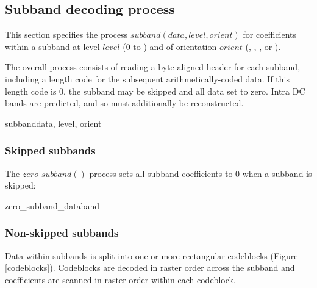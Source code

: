 \subsection{Subband decoding process}

\label{subbanddecodeprocess}

This section specifies the process $subband(data, level,orient)$ for coefficients
within a subband at level $level$ ($0$ to \TransformDepth) and of orientation $orient$
(\LL, \LH, \HL, or \HH). 

The overall process consists of reading a byte-aligned header for each
subband, including a length code for the subsequent arithmetically-coded data.
If this length code is 0, the subband may be skipped and all data set to zero.
Intra DC bands are predicted, and so must additionally be reconstructed.

\begin{pseudo}{subband}{data, level, orient}
\bsELSE
\bsEND 
{}
\bsEND
\end{pseudo}

\subsubsection{Skipped subbands}
\label{zerosubband}

The $zero\_subband()$ process sets all subband coefficients to 0 when
a subband is skipped:

\begin{pseudo}{zero\_subband\_data}{band}
  \bsEND
\bsEND
\end{pseudo}

\subsubsection{Non-skipped subbands}
\label{subbandcoeffs}

Data within subbands is split into one or more rectangular codeblocks (Figure \ref{codeblocks}).
Codeblocks are decoded in raster order across the subband and coefficients are scanned in raster order
within each codeblock. 

